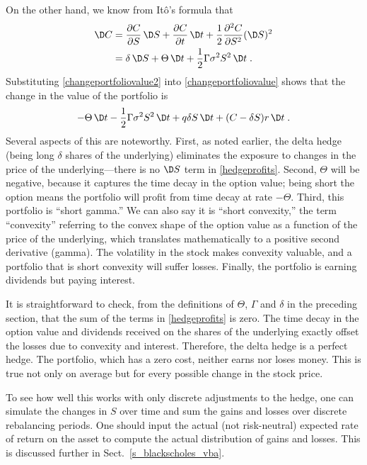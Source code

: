 On the other hand, we know from It\^o's formula that
\begin{align}
\D C &= \frac{\partial C}{\partial S}\,\D S + \frac{\partial C}{\partial t}\,\D t + \frac{1}{2}\frac{\partial^2C}{\partial S^2} (\D S)^2 \notag \\
&= \delta \,\D S + \Theta \,\D t + \frac{1}{2}\Gamma \sigma^2S^2\,\D t\;.\label{changeportfoliovalue2}
\end{align}
Substituting \eqref{changeportfoliovalue2} into \eqref{changeportfoliovalue} shows that  the change in the value of the portfolio is
\begin{equation}\label{hedgeprofits}
-\Theta \,\D t - \frac{1}{2}\Gamma \sigma^2S^2\,\D t+ q \delta S\,\D t+(C-\delta S)r\,\D t\;.
\end{equation}
Several aspects of this are noteworthy.  First, as noted earlier, the delta hedge (being long $\delta$ shares of the underlying) eliminates the exposure to changes in the price of the underlying---there is no $\D S$ term in \eqref{hedgeprofits}.  Second, $\Theta$ will be negative, because it captures the time decay in the option value; being short the option means the portfolio will profit from time decay at rate $-\Theta$.  Third, this portfolio is ``short gamma.''  We can also say it is ``short convexity,'' the term ``convexity''  referring to the convex shape of the option value as a function of the price of the underlying, which translates mathematically to a positive second derivative (gamma).  The volatility in the stock makes convexity valuable, and a portfolio that is short convexity will suffer losses.  Finally, the portfolio is earning dividends but paying interest.

It is straightforward to check, from the definitions of $\Theta$, $\Gamma$ and $\delta$ in the preceding section, that
the sum of the terms in \eqref{hedgeprofits} is zero.  The time decay in the option value and dividends received on the shares of the underlying exactly offset the losses due to convexity and interest.
Therefore, the delta hedge is a perfect hedge.  The portfolio, which has a zero cost, neither earns nor loses money.  This is true not only on average but for every possible change in the stock price.  

To see how well this works with only discrete adjustments to the hedge, one can simulate the changes in $S$ over time and sum the gains and losses over discrete rebalancing periods.  One should input the actual (not risk-neutral) expected rate of return on the asset to compute the actual distribution of gains and losses.  This is discussed further in Sect.~\ref{s_blackscholes_vba}.

